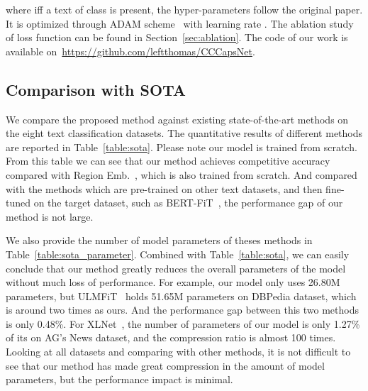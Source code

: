 \documentclass[times,twocolumn,final]{elsarticle}
\begin{document}
where  iff a text of class  is present, the hyper-parameters follow the original paper. It is optimized through ADAM scheme~\cite{kingma2015adam} with learning rate . The ablation study of loss function can be found in Section~\ref{sec:ablation}. The code of our work is available on~\url{https://github.com/leftthomas/CCCapsNet}.

\subsection{Comparison with SOTA}

We compare the proposed method against existing state-of-the-art methods on the eight text classification datasets. The quantitative results of different methods are reported in Table~\ref{table:sota}. Please note our model is trained from scratch. From this table we can see that our method achieves competitive accuracy compared with Region Emb.~\cite{qiao2018new}, which is also trained from scratch. And compared with the methods which are pre-trained on other text datasets, and then fine-tuned on the target dataset, such as BERT-FiT~\cite{sun2019fine}, the performance gap of our method is not large.

We also provide the number of model parameters of theses methods in Table~\ref{table:sota_parameter}. Combined with Table~\ref{table:sota}, we can easily conclude that our method greatly reduces the overall parameters of the model without much loss of performance. For example, our model only uses 26.80M parameters, but ULMFiT~\cite{howard2018universal} holds 51.65M parameters on DBPedia dataset, which is around two times as ours. And the performance gap between this two methods is only 0.48\%. For XLNet~\cite{yang2019xlnet}, the number of parameters of our model is only 1.27\% of its on AG's News dataset, and the compression ratio is almost 100 times. Looking at all datasets and comparing with other methods, it is not difficult to see that our method has made great compression in the amount of model parameters, but the performance impact is minimal.

\begin{table}
  \centering
  \caption{Ablation studies for the three loss functions: cross entropy loss (), focal loss () and margin loss () on AG's News dataset. The best test accuracy (\%) are bold.}
  \label{table:loss}
\end{table}
\end{document}
